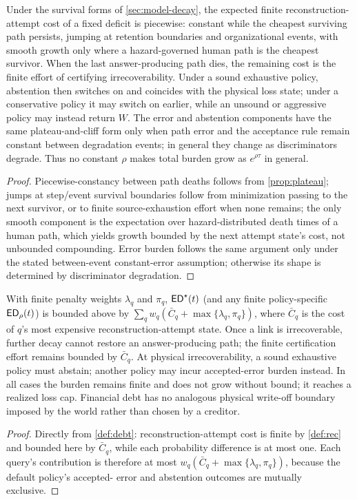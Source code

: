 \begin{proposition}
\label{prop:steps}
Under the survival forms of \cref{sec:model-decay}, the expected finite
reconstruction-attempt cost of a fixed deficit is piecewise: constant
while the cheapest surviving path persists, jumping at retention boundaries and
organizational events, with smooth growth only where a hazard-governed human path
is the cheapest survivor. When the last answer-producing path dies, the remaining
cost is the finite effort of certifying irrecoverability. Under a sound exhaustive
policy, abstention then switches on and coincides with the physical loss state;
under a conservative policy it may switch on earlier, while an unsound or
aggressive policy may instead return $W$. The error and
abstention components have the same plateau-and-cliff form only when path error and
the acceptance rule remain constant between degradation events; in general they
change as discriminators degrade. Thus no constant $\rho$ makes total burden grow as
$e^{\rho \tau}$ in general.
\end{proposition}
\begin{proof}
Piecewise-constancy between path deaths follows from \cref{prop:plateau}; jumps at
step/event survival boundaries follow from minimization passing to the next
survivor, or to finite source-exhaustion effort when none remains; the only smooth
component is the expectation over hazard-distributed death times of a human path,
which yields growth bounded by the next attempt state's cost, not unbounded
compounding.
Error burden follows the same argument only under the stated between-event
constant-error assumption; otherwise its shape is determined by discriminator
degradation.
\end{proof}

\begin{proposition}
\label{prop:writeoff}
With finite penalty weights $\lambda_q$ and $\pi_q$, $\mathsf{ED}^{\star}(t)$ (and any
finite policy-specific $\mathsf{ED}_\rho(t)$) is bounded above by
$\sum_q w_q(\bar{C}_q + \max\{\lambda_q,\pi_q\})$, where $\bar{C}_q$ is the cost of $q$'s most
expensive reconstruction-attempt state. Once a link is irrecoverable, further decay
cannot restore an answer-producing path; the finite certification effort remains
bounded by $\bar{C}_q$. At physical irrecoverability, a sound exhaustive policy must
abstain; another policy may incur accepted-error burden instead. In all cases the
burden remains finite and does not grow without bound; it reaches a realized loss
cap. Financial debt has no
analogous physical write-off boundary imposed by the world rather than chosen by a
creditor.
\end{proposition}
\begin{proof}
Directly from \cref{def:debt}: reconstruction-attempt cost is finite by
\cref{def:rec} and bounded here by $\bar{C}_q$, while each probability difference
is at most one. Each query's contribution is therefore at most
$w_q(\bar{C}_q+\max\{\lambda_q,\pi_q\})$, because the default policy's accepted-
error and abstention outcomes are mutually exclusive.
\end{proof}

